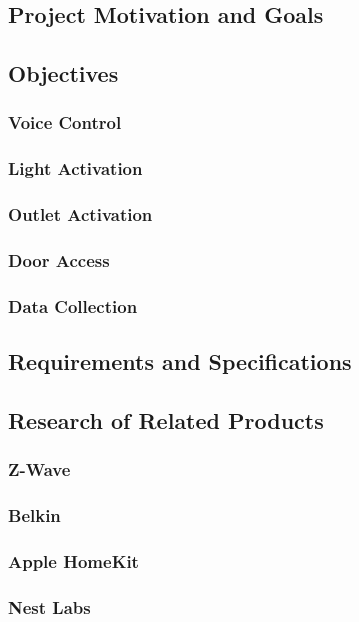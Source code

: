 
\subsection{Project Motivation and Goals}

\subsection{Objectives}

\subsubsection{Voice Control}

\subsubsection{Light Activation}

\subsubsection{Outlet Activation}

\subsubsection{Door Access}

\subsubsection{Data Collection}

\subsection{Requirements and Specifications}

\subsection{Research of Related Products}

\subsubsection{Z-Wave}

\subsubsection{Belkin}

\subsubsection{Apple HomeKit}

\subsubsection{Nest Labs}

